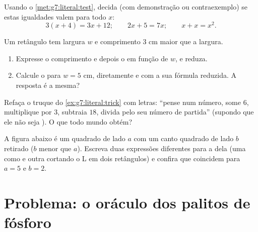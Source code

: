 \begin{exercise}[$\star\star$]\label{exo:g7:literal:8}
Usando o \cref{met:g7:literal:test}, decida (com demonstração ou
contraexemplo) se estas igualdades valem para todo $x$:
\[
3(x + 4) = 3x + 12; \qquad
2x + 5 = 7x; \qquad
x + x = x^2 .
\]
\end{exercise}

\begin{exercise}[$\star\star$]\label{exo:g7:literal:9}
Um retângulo tem largura $w$ e comprimento $3$ cm maior que a largura.
\begin{enumerate}
  \item Expresse o comprimento e depois o  em função de $w$, e
        reduza.
  \item Calcule o  para $w = 5$ cm, diretamente e com a sua
        fórmula reduzida. A resposta é a mesma?
\end{enumerate}
\end{exercise}

\begin{exercise}[$\star\star$]\label{exo:g7:literal:10}
Refaça o truque do \cref{ex:g7:literal:trick} com letras: ``pense num
número, some $6$, multiplique por $3$, subtraia $18$, divida pelo seu
número de partida'' (supondo que ele não seja ). O que todo mundo
obtém?
\end{exercise}

\begin{exercise}[$\star\star\star$]\label{exo:g7:literal:11}
A figura abaixo é um quadrado de lado $a$ com um canto quadrado de lado
$b$ retirado ($b$ menor que $a$). Escreva duas expressões diferentes
para a  dela (uma como  e outra cortando o L em dois
retângulos) e confira que coincidem para $a = 5$ e $b = 2$.
\end{exercise}

\section{Problema: o oráculo dos palitos de fósforo}

